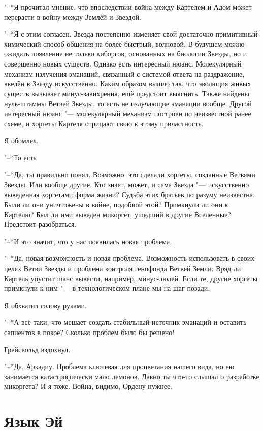 "--*Я прочитал мнение, что впоследствии война между Картелем и Адом может перерасти в войну между Землёй и Звездой.

"--*Я с этим согласен.
Звезда постепенно изменяет свой достаточно примитивный химический способ общения на более быстрый, волновой.
В будущем можно ожидать появление не только киборгов, основанных на биологии Звезды, но и совершенно новых существ.
Однако есть интересный нюанс.
Молекулярный механизм излучения эманаций, связанный с системой ответа на раздражение, введён в Звезду искусственно.
Каким образом вышло так, что эволюция живых существ вызывает минус-завихрения, ещё предстоит выяснить.
Также найдены нуль-штаммы Ветвей Звезды, то есть не излучающие эманации вообще.
Другой интересный нюанс "--- молекулярный механизм построен по неизвестной ранее схеме, и хоргеты Картеля отрицают свою к этому причастность.

Я обомлел.

"--*То есть\ldotsq

"--*Да, ты правильно понял.
Возможно, это сделали хоргеты, созданные Ветвями Звезды.
Или вообще другие.
Кто знает, может, и сама Звезда "--- искусственно выведенная хоргетами форма жизни?
Судьба этих братьев по разуму неизвестна.
Были ли они уничтожены в войне, подобной этой?
Примкнули ли они к Картелю?
Был ли ими выведен микоргет, ушедший в другие Вселенные?
Предстоит разобраться.

"--*И это значит, что у нас появилась новая проблема.

"--*Да, новая возможность и новая проблема.
Возможность использовать в своих целях Ветви Звезды и проблема контроля генофонда Ветвей Земли.
Вряд ли Картель упустит шанс вывести, например, минус-людей.
Если те, другие хоргеты примкнули к ним "--- в технологическом плане мы на шаг позади.

Я обхватил голову руками.

"--*А всё-таки, что мешает создать стабильный источник эманаций и оставить сапиентов в покое?
Сколько проблем было бы решено!

Грейсвольд вздохнул.

"--*Да, Аркадиу.
Проблема ключевая для процветания нашего вида, но ею занимается катастрофически мало демонов.
Давно ты что-то слышал о разработке микоргета?
И я тоже.
Война, видимо, Ордену нужнее.

\section{Язык Эй}

